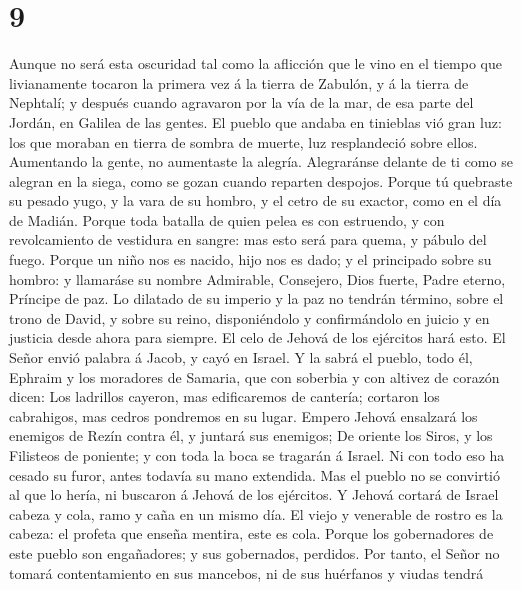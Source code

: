 \hypertarget{section-8}{%
\section{9}\label{section-8}}

 Aunque no será esta oscuridad tal como la aflicción que le
vino en el tiempo que livianamente tocaron la primera vez á la tierra de
Zabulón, y á la tierra de Nephtalí; y después cuando agravaron por la
vía de la mar, de esa parte del Jordán, en Galilea de las gentes.
 El pueblo que andaba en tinieblas vió gran luz: los que
moraban en tierra de sombra de muerte, luz resplandeció sobre ellos.
 Aumentando la gente, no aumentaste la alegría. Alegraránse
delante de ti como se alegran en la siega, como se gozan cuando reparten
despojos.  Porque tú quebraste su pesado yugo, y la vara de
su hombro, y el cetro de su exactor, como en el día de Madián.
 Porque toda batalla de quien pelea es con estruendo, y con
revolcamiento de vestidura en sangre: mas esto será para quema, y pábulo
del fuego.  Porque un niño nos es nacido, hijo nos es dado;
y el principado sobre su hombro: y llamaráse su nombre Admirable,
Consejero, Dios fuerte, Padre eterno, Príncipe de paz.  Lo
dilatado de su imperio y la paz no tendrán término, sobre el trono de
David, y sobre su reino, disponiéndolo y confirmándolo en juicio y en
justicia desde ahora para siempre. El celo de Jehová de los ejércitos
hará esto.  El Señor envió palabra á Jacob, y cayó en
Israel.  Y la sabrá el pueblo, todo él, Ephraim y los
moradores de Samaria, que con soberbia y con altivez de corazón dicen:
 Los ladrillos cayeron, mas edificaremos de cantería;
cortaron los cabrahigos, mas cedros pondremos en su lugar. 
Empero Jehová ensalzará los enemigos de Rezín contra él, y juntará sus
enemigos;  De oriente los Siros, y los Filisteos de
poniente; y con toda la boca se tragarán á Israel. Ni con todo eso ha
cesado su furor, antes todavía su mano extendida.  Mas el
pueblo no se convirtió al que lo hería, ni buscaron á Jehová de los
ejércitos.  Y Jehová cortará de Israel cabeza y cola, ramo
y caña en un mismo día.  El viejo y venerable de rostro es
la cabeza: el profeta que enseña mentira, este es cola. 
Porque los gobernadores de este pueblo son engañadores; y sus
gobernados, perdidos.  Por tanto, el Señor no tomará
contentamiento en sus mancebos, ni de sus huérfanos y viudas tendrá
